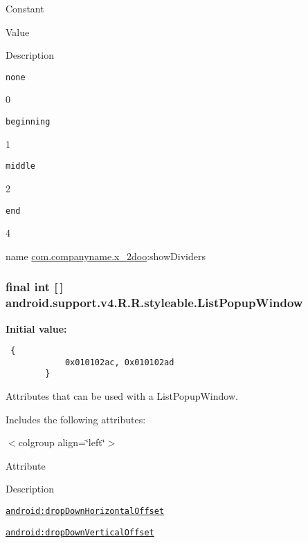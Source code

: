 Constant

Value

Description 

{\tt none}

0

{\tt beginning}

1

{\tt middle}

2

{\tt end}

4

name \hyperlink{namespacecom_1_1companyname_1_1x__2doo}{com.companyname.x\_\-2doo}:showDividers \hypertarget{classandroid_1_1support_1_1v4_1_1_r_1_1styleable_a0e1ff67246990456b474c947ecb8b7e}{
\subsubsection[{ListPopupWindow}]{\setlength{\rightskip}{0pt plus 5cm}final int \mbox{[}$\,$\mbox{]} android.support.v4.R.R.styleable.ListPopupWindow}}
\label{classandroid_1_1support_1_1v4_1_1_r_1_1styleable_a0e1ff67246990456b474c947ecb8b7e}


\textbf{Initial value:}

\begin{Code}\begin{verbatim} {
            0x010102ac, 0x010102ad
        }
\end{verbatim}
\end{Code}
Attributes that can be used with a ListPopupWindow. 

Includes the following attributes: \begin{TabularC}{0}
\hline
\end{TabularC}
$<$colgroup align=\char`\"{}left\char`\"{}$>$ 

Attribute

Description 

{\tt \hyperlink{classandroid_1_1support_1_1v4_1_1_r_1_1styleable_2e96b042761bd1aeda203521812c584e}{android:dropDownHorizontalOffset}}

{\tt \hyperlink{classandroid_1_1support_1_1v4_1_1_r_1_1styleable_692ddd2493fa2024e43c7709cf955596}{android:dropDownVerticalOffset}}

